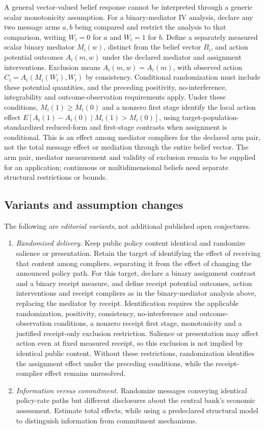\documentclass[11pt,a4paper]{article}
\begin{document}
A general vector-valued belief response cannot be interpreted through a generic scalar monotonicity assumption. For a binary-mediator IV analysis, declare any two message arms \(a,b\) being compared and restrict the analysis to that comparison, writing \(W_i=0\) for \(a\) and \(W_i=1\) for \(b\). Define a separately measured scalar binary mediator \(M_i(w)\), distinct from the belief vector \(B_i\), and action potential outcomes \(A_i(m,w)\) under the declared mediator and assignment interventions. Exclusion means \(A_i(m,w)=A_i(m)\), with observed action \(C_i=A_i(M_i(W_i),W_i)\) by consistency. Conditional randomization must include these potential quantities, and the preceding positivity, no-interference, integrability and outcome-observation requirements apply. Under these conditions, \(M_i(1)\ge M_i(0)\) and a nonzero first stage identify the local action effect \(E[A_i(1)-A_i(0)\mid M_i(1)>M_i(0)]\), using target-population-standardized reduced-form and first-stage contrasts when assignment is conditional. This is an effect among mediator compliers for the declared arm pair, not the total message effect or mediation through the entire belief vector. The arm pair, mediator measurement and validity of exclusion remain to be supplied for an application; continuous or multidimensional beliefs need separate structural restrictions or bounds.
\subsection*{Variants and assumption changes}
The following are \emph{editorial variants}, not additional published open conjectures.
\begin{enumerate}
\item \emph{Randomized delivery.} Keep public policy content identical and randomize salience or presentation. Retain the target of identifying the effect of receiving that content among compliers, separating it from the effect of changing the announced policy path. For this target, declare a binary assignment contrast and a binary receipt measure, and define receipt potential outcomes, action interventions and receipt compliers as in the binary-mediator analysis above, replacing the mediator by receipt. Identification requires the applicable randomization, positivity, consistency, no-interference and outcome-observation conditions, a nonzero receipt first stage, monotonicity and a justified receipt-only exclusion restriction. Salience or presentation may affect action even at fixed measured receipt, so this exclusion is not implied by identical public content. Without these restrictions, randomization identifies the assignment effect under the preceding conditions, while the receipt-complier effect remains unresolved.
\item \emph{Information versus commitment.} Randomize messages conveying identical policy-rate paths but different disclosures about the central bank's economic assessment. Estimate total effects, while using a predeclared structural model to distinguish information from commitment mechanisms.
\end{enumerate}
\end{document}
